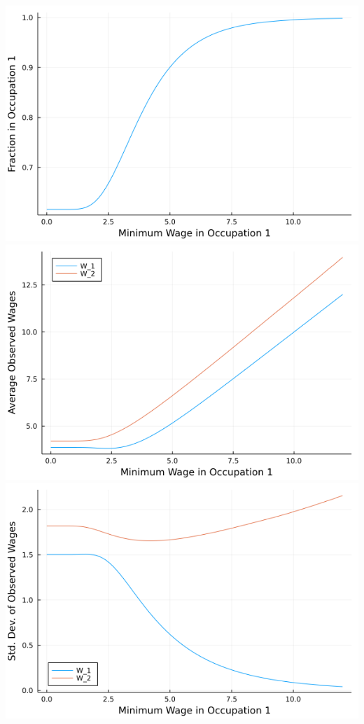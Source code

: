 \documentclass{article}
\begin{document}
\begin{enumerate}
\begin{enumerate}
\begin{center}
\includegraphics[scale =0.5]{q_h_fraction}
\includegraphics[scale =0.5]{q_h_average}
\includegraphics[scale =0.5]{q_h_std_dev}
\end{center}

\begin{center}
\end{center}

\end{enumerate}

\end{enumerate}
\end{document}
